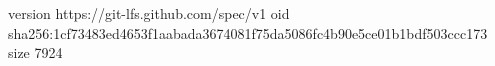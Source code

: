version https://git-lfs.github.com/spec/v1
oid sha256:1cf73483ed4653f1aabada3674081f75da5086fc4b90e5ce01b1bdf503ccc173
size 7924
